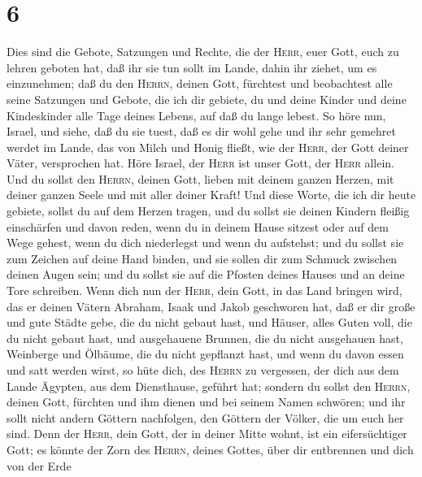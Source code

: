 \hypertarget{section-5}{%
\section{6}\label{section-5}}

 Dies sind die Gebote, Satzungen und Rechte, die der
\textsc{Herr}, euer Gott, euch zu lehren geboten hat, daß ihr sie tun
sollt im Lande, dahin ihr ziehet, um es einzunehmen;  daß
du den \textsc{Herrn}, deinen Gott, fürchtest und beobachtest alle seine
Satzungen und Gebote, die ich dir gebiete, du und deine Kinder und deine
Kindeskinder alle Tage deines Lebens, auf daß du lange lebest.
 So höre nun, Israel, und siehe, daß du sie tuest, daß es
dir wohl gehe und ihr sehr gemehret werdet im Lande, das von Milch und
Honig fließt, wie der \textsc{Herr}, der Gott deiner Väter, versprochen
hat.  Höre Israel, der \textsc{Herr} ist unser Gott, der
\textsc{Herr} allein.  Und du sollst den \textsc{Herrn},
deinen Gott, lieben mit deinem ganzen Herzen, mit deiner ganzen Seele
und mit aller deiner Kraft!  Und diese Worte, die ich dir
heute gebiete, sollst du auf dem Herzen tragen,  und du
sollst sie deinen Kindern fleißig einschärfen und davon reden, wenn du
in deinem Hause sitzest oder auf dem Wege gehest, wenn du dich
niederlegst und wenn du aufstehst;  und du sollst sie zum
Zeichen auf deine Hand binden, und sie sollen dir zum Schmuck zwischen
deinen Augen sein;  und du sollst sie auf die Pfosten
deines Hauses und an deine Tore schreiben.  Wenn dich nun
der \textsc{Herr}, dein Gott, in das Land bringen wird, das er deinen
Vätern Abraham, Isaak und Jakob geschworen hat, daß er dir große und
gute Städte gebe, die du nicht gebaut hast,  und Häuser,
alles Guten voll, die du nicht gebaut hast, und ausgehauene Brunnen, die
du nicht ausgehauen hast, Weinberge und Ölbäume, die du nicht gepflanzt
hast, und wenn du davon essen und satt werden wirst,  so
hüte dich, des \textsc{Herrn} zu vergessen, der dich aus dem Lande
Ägypten, aus dem Diensthause, geführt hat;  sondern du
sollst den \textsc{Herrn}, deinen Gott, fürchten und ihm dienen und bei
seinem Namen schwören;  und ihr sollt nicht andern
Göttern nachfolgen, den Göttern der Völker, die um euch her sind.
 Denn der \textsc{Herr}, dein Gott, der in deiner Mitte
wohnt, ist ein eifersüchtiger Gott; es könnte der Zorn des
\textsc{Herrn}, deines Gottes, über dir entbrennen und dich von der Erde
